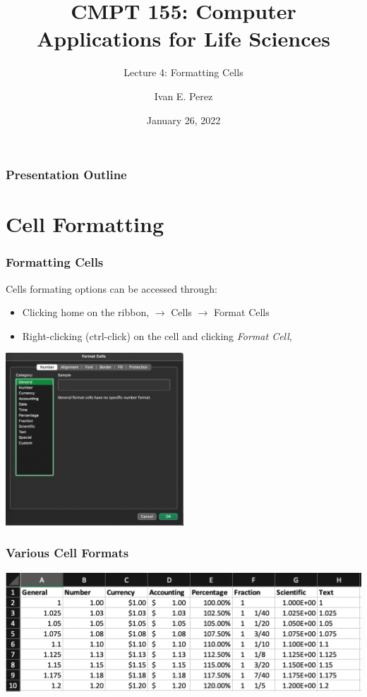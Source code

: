 \documentclass[12pt]{beamer}
\title{CMPT 155: Computer Applications for Life Sciences}
\subtitle{Lecture 4: Formatting Cells}
\author{Ivan E. Perez}
\institute{}
\date{January 26, 2022}
\begin{document}
	\begin{frame}
		\titlepage
	\end{frame}
	\begin{frame}
		\frametitle{Presentation Outline}
		\tableofcontents
	\end{frame}
\section{Cell Formatting}
	\begin{frame}
		\frametitle{Formatting Cells}
			Cells formating options can be accessed through:
		\begin{itemize}
			\item Clicking home on the ribbon, $\rightarrow$ Cells $\rightarrow$ Format Cells
			\item Right-clicking (ctrl-click) on the cell and clicking \textit{Format Cell},
		\end{itemize} 
		\begin{center}
			\includegraphics[width=0.5\textwidth]{formatcellsmenu.png}
		\end{center}
	\end{frame}
	\begin{frame}
	\frametitle{Various Cell Formats}
		\begin{center}
			\includegraphics[width=\textwidth]{variouscellformats.png}
		\end{center}
	\end{frame}
\end{document}
